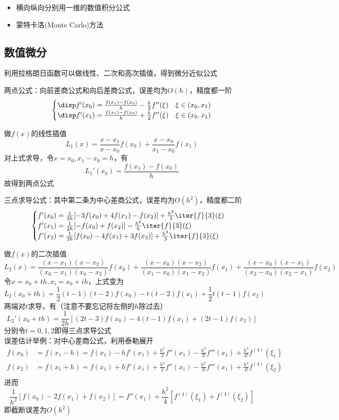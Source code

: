 \begin{itemize}
    \item 横向纵向分别用一维的数值积分公式
    \item 蒙特卡洛(Monte Carlo)方法
\end{itemize}

\subsection{数值微分}
利用拉格朗日函数可以做线性、二次和高次插值，得到微分近似公式

两点公式：向前差商公式和向后差商公式，误差均为$O(h)$，精度都一阶
\[\begin{cases}
    \disp f'(x_0)=\frac{f(x_1)-f(x_0)}{h}-\frac{h}{2}f''(\xi) & \xi\in(x_0,x_1)\\
    \disp f'(x_1)=\frac{f(x_1)-f(x_0)}{h}+\frac{h}{2}f''(\xi) & \xi\in(x_0,x_1)\\
\end{cases}\]
\begin{analysis}
    做$f(x)$的线性插值
    \[L_1(x)=\frac{x-x_1}{x-x_0}f(x_0)+\frac{x-x_0}{x_1-x_0}f(x_1)\]
    对上式求导，令$x=x_0,x_1-x_0=h$，有
    \[L_1'(x_0)=\frac{f(x_1)-f(x_0)}{h}\]
    故得到两点公式
\end{analysis}

三点求导公式：其中第二条为中心差商公式，误差均为$O(h^2)$，精度都二阶
\[\begin{cases}
    f'(x_0)=\frac{1}{2h}[-3f(x_0)+4f(x_1)-f(x_2)]+\frac{h^2}{3}\iter{f}{3}(\xi)\\
    f'(x_1)=\frac{1}{2h}[-f(x_0)+f(x_2)]-\frac{h^2}{6}\iter{f}{3}(\xi)\\
    f'(x_2)=\frac{1}{2h}[f(x_0)-4f(x_1)+3f(x_2)]+\frac{h^2}{3}\iter{f}{3}(\xi)
\end{cases}\]
\begin{analysis}
    做$f(x)$的二次插值
    \[L_2(x)=\frac{(x-x_1)(x-x_2)}{(x_0-x_1)(x_0-x_2)}f(x_0)+\frac{(x-x_0)(x-x_2)}{(x_1-x_0)(x_1-x_2)}f(x_1)+\frac{(x-x_0)(x-x_1)}{(x_2-x_0)(x_2-x_1)}f(x_2)\]
    令$x=x_0+th,x_i=x_0+ih$，上式变为
    \[L_2(x_0+th)=\frac{1}{2}(t-1)(t-2)f(x_0)-t(t-2)f(x_1)+\frac{1}{2}t(t-1)f(x_2)\]
    两端对$t$求导，有（注意不要忘记将左侧的$h$除过去）
    \[L_2'(x_0+th)=\frac{1}{2h}[(2t-3)f(x_0)-4(t-1)f(x_1)+(2t-1)f(x_2)]\]
    分别令$t=0,1,2$即得三点求导公式\\
    误差估计举例：对中心差商公式，利用泰勒展开
    \[\begin{aligned}
        f(x_0)&=f(x_1-h)=f(x_1)-hf'(x_1)+\frac{h^2}{2}f''(x_1)-\frac{h^3}{3!}f'''(x_1)+\frac{h^4}{4!}f^{(4)}(\xi_1)\\
        f(x_2)&=f(x_1+h)=f(x_1)+hf'(x_1)+\frac{h^2}{2}f''(x_1)-\frac{h^3}{3!}f'''(x_1)+\frac{h^4}{4!}f^{(4)}(\xi_2)\\
    \end{aligned}\]
    进而
    \[\frac{1}{h^2}[f(x_0)-2f(x_1)+f(x_2)]=f''(x_1)+\frac{h^2}{4}[f^{(4)}(\xi_1)+f^{(4)}(\xi_2)]\]
    即截断误差为$O(h^2)$
\end{analysis}
